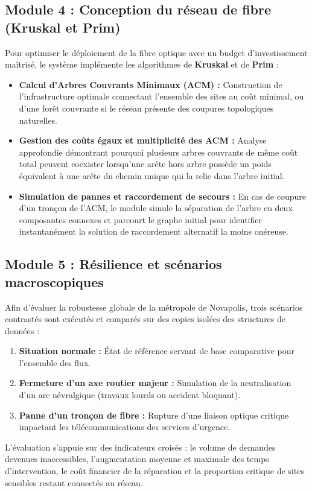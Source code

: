\subsection{Module 4 : Conception du réseau de fibre (Kruskal et Prim)}
Pour optimiser le déploiement de la fibre optique avec un budget d'investissement maîtrisé, le système implémente les algorithmes de \textbf{Kruskal} et de \textbf{Prim} :
\begin{itemize}
    \item \textbf{Calcul d'Arbres Couvrants Minimaux (ACM) :} Construction de l'infrastructure optimale connectant l'ensemble des sites au coût minimal, ou d'une forêt couvrante si le réseau présente des coupures topologiques naturelles.
    \item \textbf{Gestion des coûts égaux et multiplicité des ACM :} Analyse approfondie démontrant pourquoi plusieurs arbres couvrants de même coût total peuvent coexister lorsqu'une arête hors arbre possède un poids équivalent à une arête du chemin unique qui la relie dans l'arbre initial.
    \item \textbf{Simulation de pannes et raccordement de secours :} En cas de coupure d'un tronçon de l'ACM, le module simule la séparation de l'arbre en deux composantes connexes et parcourt le graphe initial pour identifier instantanément la solution de raccordement alternatif la moins onéreuse.
\end{itemize}

\subsection{Module 5 : Résilience et scénarios macroscopiques}
Afin d'évaluer la robustesse globale de la métropole de Novapolis, trois scénarios contrastés sont exécutés et comparés sur des copies isolées des structures de données :
\begin{enumerate}
    \item \textbf{Situation normale :} État de référence servant de base comparative pour l'ensemble des flux.
    \item \textbf{Fermeture d'un axe routier majeur :} Simulation de la neutralisation d'un arc névralgique (travaux lourds ou accident bloquant).
    \item \textbf{Panne d'un tronçon de fibre :} Rupture d'une liaison optique critique impactant les télécommunications des services d'urgence.
\end{enumerate}
L'évaluation s'appuie sur des indicateurs croisés : le volume de demandes devenues inaccessibles, l'augmentation moyenne et maximale des temps d'intervention, le coût financier de la réparation et la proportion critique de sites sensibles restant connectés au réseau.